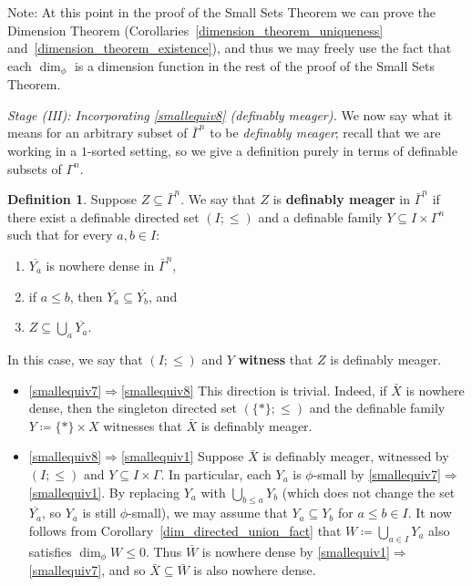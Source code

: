 \documentclass[11pt]{amsart}
\theoremstyle{plain}
\theoremstyle{definition}
\newtheorem{definition}[thm]{Definition}
\numberwithin{equation}{section}
\newcommand\0{\varnothing}
\begin{document}
Note: At this point in the proof of the Small Sets Theorem we can prove the Dimension Theorem (Corollaries~\ref{dimension_theorem_uniqueness} and~\ref{dimension_theorem_existence}), and thus we may freely use the fact that each $\dim_{\phi}$ is a dimension function in the rest of the proof of the Small Sets Theorem.


\emph{Stage (III): Incorporating \eqref{smallequiv8} (definably meager).}
We now say what it means for an arbitrary subset of $\bar{\Gamma}^n$ to be \emph{definably meager}; recall that we are working in a $1$-sorted setting, so we give a definition purely in terms of definable subsets of $\Gamma^n$. 


\begin{definition}
Suppose $Z\subseteq\bar{\Gamma}^n$. We say that $Z$ is \textbf{definably meager} in $\bar{\Gamma}^n$ if there exist a definable directed set $(I;\leq)$ and a definable family $Y\subseteq I\times\Gamma^n$ such that for every $a,b\in I$:
\begin{enumerate}
\item $\overline{Y_a}$ is nowhere dense in $\bar{\Gamma}^n$,
\item if $a\leq b$, then $\overline{Y_a}\subseteq\overline{Y_b}$, and
\item $Z\subseteq\bigcup_a\overline{Y_a}$.
\end{enumerate}
In this case, we say that $(I;\leq)$ and $Y$ \textbf{witness} that $Z$ is definably meager.
\end{definition}

\begin{itemize}
\item \eqref{smallequiv7}$\Rightarrow$\eqref{smallequiv8} This direction is trivial. Indeed, if $\bar{X}$ is nowhere dense, then the singleton directed set $(\{\ast\};\leq)$ and the definable family $Y\coloneqq\{\ast\}\times X$ witnesses that $\bar{X}$ is definably meager.
\item \eqref{smallequiv8}$\Rightarrow$\eqref{smallequiv1} Suppose $\bar{X}$ is definably meager, witnessed by $(I;\leq)$ and $Y\subseteq I\times\Gamma$. In particular, each $Y_a$ is $\phi$-small by \eqref{smallequiv7}$\Rightarrow$\eqref{smallequiv1}. By replacing $Y_a$ with $\bigcup_{b\leq a}Y_b$ (which does not change the set $\overline{Y_a}$, so $Y_a$ is still $\phi$-small), we may assume that $Y_a\subseteq Y_b$ for $a\leq b\in I$.
It now follows from Corollary~\ref{dim_directed_union_fact} that $W\coloneqq\bigcup_{a\in I}Y_a$ also satisfies $\dim_{\phi}W\leq 0$. Thus $\bar{W}$ is nowhere dense by \eqref{smallequiv1}$\Rightarrow$\eqref{smallequiv7}, and so $\bar{X}\subseteq \bar{W}$ is also nowhere dense.
\end{itemize}
\end{document}
